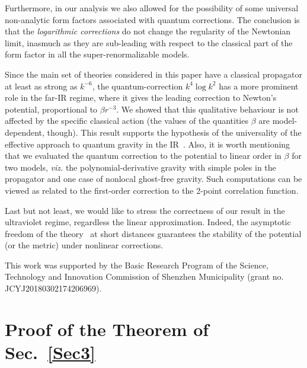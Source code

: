 \documentclass[aps,prd,a4paper,twocolumn,showpacs,showkeys,preprintnumbers,amsmath,amssymb,nofootinbib]{revtex4-2}
\renewcommand{\thesection}{\arabic{section}}
\numberwithin{equation}{section}
\let\oldsection\section%
\renewcommand{\section}{%
  \renewcommand{\theequation}{\thesection.\arabic{equation}}%
  \oldsection}%
\def\be{\beta}
\begin{document}
Furthermore, in our analysis we also allowed for the possibility of some  universal non-analytic form factors associated with quantum corrections. The conclusion is that the {\it logarithmic corrections} do not change the regularity of the Newtonian limit, inasmuch as they are sub-leading with respect to the classical part of the form factor in all the super-renormalizable models.

Since the main set of theories considered in this paper have a classical propagator at least as strong as $k^{-6}$,  the quantum-correction $k^4 \log k^2$ has a more prominent role in the far-IR regime, where it gives the leading correction to Newton's potential, proportional to $ \beta r^{-3}$. We showed that this qualitative behaviour is not affected by the specific classical action (the values of the quantities $\be$ are model-dependent, though). This result supports the hypothesis of the universality of the effective approach to quantum gravity in the IR~\cite{Duff:1974ud,Donoghue:1993&94,Muzinich:1995uj,Hamber:1995cq,Dalvit:1997yc,Akhundov:1996jd,Khriplovich:2002bt,BjerrumBohr:2002kt}. Also, it is worth mentioning that we evaluated the quantum correction to the potential to linear order in $\be$ for two models, \textit{viz.} the polynomial-derivative gravity with simple poles in the propagator and one case of nonlocal ghost-free gravity.
Such computations can be viewed as related to the first-order correction to the 2-point correlation function.

Last but not least, we would like to stress the correctness of our result in the ultraviolet regime, regardless the linear approximation. Indeed, the asymptotic freedom of the theory~\cite{Briscese:2019twl} at short distances guarantees the stability of the potential (or the metric) under nonlinear corrections.



\begin{acknowledgements}
This work was supported by the Basic Research Program of the Science, Technology and Innovation Commission of Shenzhen Municipality (grant no. JCYJ20180302174206969).
\end{acknowledgements}




\appendix
\section{Proof of the Theorem of Sec.~\ref{Sec3}}
\label{APP}
\end{document}
